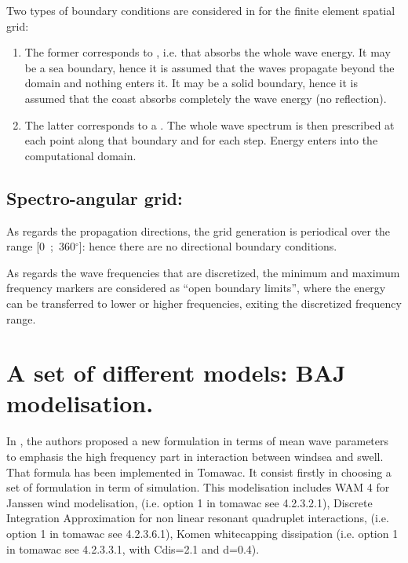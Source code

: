  Two types of boundary conditions are considered in \tomawac for the finite element spatial grid:

\begin{enumerate}
\item  The former corresponds to , i.e. that absorbs the whole wave energy. It may be a sea boundary, hence it is assumed that the waves propagate beyond the domain and nothing enters it. It may be a solid boundary, hence it is assumed that the coast absorbs completely the wave energy (no reflection).

\item  The latter corresponds to a . The whole wave spectrum is then prescribed at each point along that boundary and for each step. Energy enters into the computational domain.
\end{enumerate}


\subsection{ Spectro-angular grid:}

 As regards the propagation directions, the grid generation is periodical over the range [0~;~360${}^\circ$]: hence there are no directional boundary conditions.

 As regards the wave frequencies that are discretized, the minimum and maximum frequency markers are considered as ``open boundary limits'', where the energy can be transferred to lower or higher frequencies, exiting the discretized frequency range.


\section{ A set of different models: BAJ modelisation. }
\label{se:baj}
 In \cite{Bidlot2007}, the authors proposed a new formulation in terms of mean wave parameters to emphasis the high frequency part in interaction between windsea and swell. That formula has been implemented in Tomawac. It consist firstly in choosing a set of formulation in term of simulation. This modelisation includes WAM 4 for Janssen wind modelisation, (i.e. option 1 in tomawac see 4.2.3.2.1), Discrete Integration Approximation for non linear resonant quadruplet interactions, (i.e. option 1 in tomawac see 4.2.3.6.1), Komen whitecapping dissipation (i.e. option 1 in tomawac see 4.2.3.3.1, with Cdis=2.1 and d=0.4).

